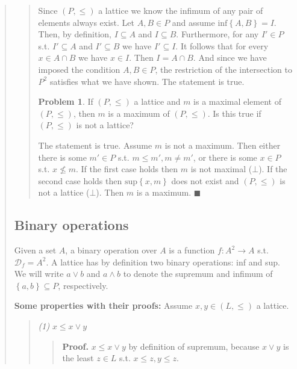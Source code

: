 \documentclass[a4paper, 12pt]{article}
\theoremstyle{definition}
\newtheorem{problem}{Problem}
\theoremstyle{definition}
\theoremstyle{definition}
\begin{document}
\begin{quote}
\begin{quote}
Since $(P, \leq) $ a lattice we know the infimum of any pair of elements always
exist. Let $A, B \in P$ and assume $\text{inf}\left\{ A, B \right\} = I $. Then,
by definition, $I \subseteq A$ and $I \subseteq B$. Furthermore, for any $I' \in
P$ s.t. $I' \subseteq A$ and $I' \subseteq B$ we have $I' \subseteq I$. It
follows that for every $x \in A \cap B$ we have $x \in I$. Then $I = A \cap B$.
And since we have imposed the condition $A, B \in P$, the restriction of the
intersection to $P^2$ satisfies what we have shown. The statement is true.

\begin{problem}
    If $(P, \leq) $ a lattice and $m$ is a maximal element of $(P, \leq) $,
    then $m$ is a maximum of $(P, \leq) $. Is this true if $(P, \leq) $ is not a
    lattice?
\end{problem}

The statement is true. Assume $m$ is not a maximum. Then either there is some
$m' \in P$ s.t. $m \leq m', m \neq m'$, or there is some $x \in P$
s.t. $x \not\leq m$. If the first case holds then $m$ is not maximal ($\bot$).
If the second case holds then $\text{sup}\left\{ x, m \right\} $ does not exist
and $(P, \leq) $ is not a lattice ($\bot$). Then $m$ is a maximum. $\blacksquare$


\end{quote}
\normalsize


\subsection{Binary operations}

Given a set $A$, a binary operation over $A$ is a function $f : A^2 \to A$ s.t.
$\mathcal{D}_f = A^2$. A lattice has by definition two binary operations: inf and
sup. We will write $a \lor b$ and $a \land b$ to denote the supremum
and infimum of $\left\{ a, b \right\} \subseteq P$, respectively.

\textbf{Some properties with their proofs:} Assume $x, y \in (L, \leq)$ a
lattice.

\begin{quote}
    \textit{(1)} $x \leq x \lor  y$ 

    \begin{quote}
        \textbf{Proof.} $x \leq x \lor  y$ by definition of supremum, because $x
        \lor  y$ is the least $z \in L$ s.t. $x \leq z, y \leq z$.
    \end{quote}


\end{quote}
\end{quote}
\end{document}
